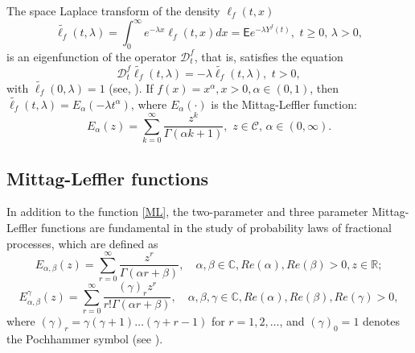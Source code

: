 \documentclass[12pt]{article}
\theoremstyle{definition}
\theoremstyle{plain}
\newcommand{\E}{\mathsf{E}}
\begin{document}
The space Laplace transform of the density $\ell_f(t,x)$ 
\begin{equation}\label{tilde_l}
\tilde{\ell_f}(t,\lambda)=\int_{0}^{\infty}e^{-\lambda x} \ell_f(t,x)dx= {\E}e^{-\lambda Y^f(t)}, \,\, t\ge0, \,\lambda>0,
\end{equation}
is an eigenfunction of the operator $\mathcal{D}^f_t$, that is, satisfies the equation
	\begin{equation}\label{lapl}
		\mathcal{D}^f_t\tilde{\ell_f}(t,\lambda)=-\lambda \tilde{\ell_f}(t,\lambda),\,\,t>0,
	\end{equation}
with $\tilde{\ell_f}(0,\lambda)=1$ (see, \cite{BS2019, K, MT}). 
If $f(x)=x^{\alpha},x>0, \alpha\in (0,1)$, then $\tilde{\ell_f}(t,\lambda)=%
{E}_\alpha(-\lambda t^\alpha)$, where $%
{E}_\alpha(\cdot)$ is the Mittag-Leffler function:
\begin{equation}\label{ML}
{E}_\alpha(z)=\sum_{k=0}^\infty \frac{z^k}{\Gamma(\alpha k +1)}, \,\, z\in \mathcal{C}, \, \alpha\in  (0, \infty). 
\end{equation}

\subsection{Mittag-Leffler functions}
In addition to the function \eqref{ML}, the  two-parameter and three parameter Mittag-Leffler functions are fundamental in the study of probability laws of fractional processes, which are defined as
\begin{equation}\label{ML2}
	E_{\alpha,\beta}(z) = \sum_{r=0}^{\infty} \frac{z^r}{\Gamma(\alpha r + \beta)}, \quad \alpha, \beta \in \mathbb{C}, Re(\alpha), Re(\beta) > 0, z \in \mathbb{R};
\end{equation}
\begin{equation}\label{ML3}
	E_{\alpha,\beta}^{\gamma}(z) = \sum_{r=0}^{\infty} \frac{(\gamma)_r z^r}{r! \Gamma(\alpha r + \beta)}, \quad \alpha, \beta, \gamma \in \mathbb{C}, Re(\alpha), Re(\beta), Re(\gamma) > 0,
\end{equation}
where $(\gamma)_r = \gamma(\gamma+1)\dots(\gamma+r-1)$ for $r=1,2,\dots$, and $(\gamma)_0 = 1$ denotes the Pochhammer symbol (see \cite{HMS}).
\end{document}
